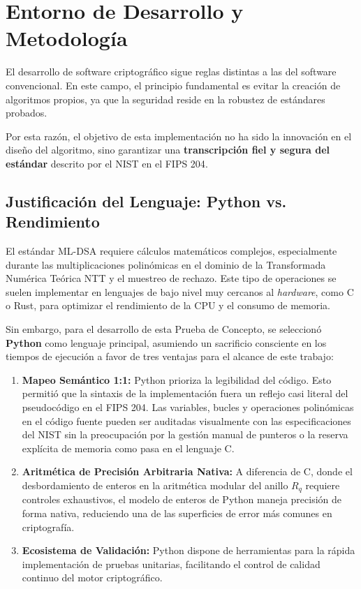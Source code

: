 \documentclass[11pt, a4paper]{report}
\theoremstyle{definition}
\begin{document}
\section{Entorno de Desarrollo y Metodología}
\label{sec:entorno_metodologia}

El desarrollo de software criptográfico sigue reglas distintas a las del software convencional. En este campo, el principio fundamental es evitar la creación de algoritmos propios, ya que la seguridad reside en la robustez de estándares probados. 

Por esta razón, el objetivo de esta implementación no ha sido la innovación en el diseño del algoritmo, sino garantizar una \textbf{transcripción fiel y segura del estándar} descrito por el NIST en el FIPS 204\cite{nist_fips204}.

\subsection{Justificación del Lenguaje: Python vs. Rendimiento}
\label{subsec:justificacion_python}

El estándar ML-DSA requiere cálculos matemáticos complejos, especialmente durante las multiplicaciones polinómicas en el dominio de la Transformada Numérica Teórica NTT y el muestreo de rechazo. Este tipo de operaciones se suelen implementar en lenguajes de bajo nivel muy cercanos al \textit{hardware}, como C o Rust, para optimizar el rendimiento de la CPU y el consumo de memoria.

Sin embargo, para el desarrollo de esta Prueba de Concepto, se seleccionó \textbf{Python} como lenguaje principal, asumiendo un sacrificio consciente en los tiempos de ejecución a favor de tres ventajas para el alcance de este trabajo:

\begin{enumerate}
    \item \textbf{Mapeo Semántico 1:1:} Python prioriza la legibilidad del código. Esto permitió que la sintaxis de la implementación fuera un reflejo casi literal del pseudocódigo en el FIPS 204. Las variables, bucles y operaciones polinómicas en el código fuente pueden ser auditadas visualmente con las especificaciones del NIST sin la preocupación por la gestión manual de punteros o la reserva explícita de memoria como pasa en el lenguaje C.
    \item \textbf{Aritmética de Precisión Arbitraria Nativa:} A diferencia de C, donde el desbordamiento de enteros  en la aritmética modular del anillo $R_q$ requiere controles exhaustivos, el modelo de enteros de Python maneja precisión de forma nativa, reduciendo una de las superficies de error más comunes en criptografía.
    \item \textbf{Ecosistema de Validación:} Python dispone de herramientas para la rápida implementación de pruebas unitarias, facilitando el control de calidad continuo del motor criptográfico.
\end{enumerate}
\end{document}
